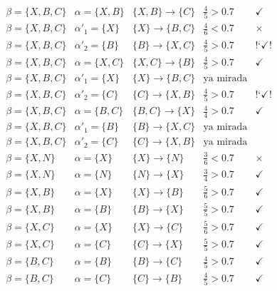\documentclass[12pt]{report}\usepackage[]{graphicx}\usepackage[dvipsnames]{xcolor}
\begin{document}
			$$
			\begin{array}{lllcc}
				\beta = \{X, B, C\} & \alpha = \{X, B\} & \boxed{\{X, B\} \rightarrow \{C\}} & \frac{4}{5} > 0.7 & \checkmark\\
				\beta = \{X, B, C\} & \alpha'_1 = \{X\} & \{X\} \rightarrow \{B, C\} & \frac{4}{6} < 0.7 & \times\\
				\beta = \{X, B, C\} & \alpha'_2 = \{B\} & \boxed{\{B\} \rightarrow \{X, C\}} & \frac{4}{5} > 0.7 & \text{!`}\checkmark!\\
				\beta = \{X, B, C\} & \alpha = \{X, C\} & \boxed{\{X, C\} \rightarrow \{B\}} & \frac{4}{5} > 0.7 & \checkmark\\
				\beta = \{X, B, C\} & \alpha'_1 = \{X\} & \{X\} \rightarrow \{B, C\} & \text{ya mirada} & \\
				\beta = \{X, B, C\} & \alpha'_2 = \{C\} & \boxed{\{C\} \rightarrow \{X, B\}} & \frac{4}{5} > 0.7 & \text{!`}\checkmark!\\
				\beta = \{X, B, C\} & \alpha = \{B, C\} & \boxed{\{B, C\} \rightarrow \{X\}} & \frac{4}{4} > 0.7 & \checkmark\\
				\beta = \{X, B, C\} & \alpha'_1 = \{B\} & \{B\} \rightarrow \{X, C\} & \text{ya mirada} & \\
				\beta = \{X, B, C\} & \alpha'_2 = \{C\} & \{C\} \rightarrow \{X, B\} & \text{ya mirada} & \\
				\beta = \{X, N\} & \alpha = \{X\} & \{X\} \rightarrow \{N\} & \frac{3}{6} < 0.7 & \times\\
				\beta = \{X, N\} & \alpha = \{N\} & \boxed{\{N\} \rightarrow \{X\}} & \frac{3}{4} > 0.7 & \checkmark\\
				\beta = \{X, B\} & \alpha = \{X\} & \boxed{\{X\} \rightarrow \{B\}} & \frac{5}{6} > 0.7 & \checkmark\\
				\beta = \{X, B\} & \alpha = \{B\} & \boxed{\{B\} \rightarrow \{X\}} & \frac{5}{5} > 0.7 & \checkmark\\
				\beta = \{X, C\} & \alpha = \{X\} & \boxed{\{X\} \rightarrow \{C\}} & \frac{5}{6} > 0.7 & \checkmark\\
				\beta = \{X, C\} & \alpha = \{C\} & \boxed{\{C\} \rightarrow \{X\}} & \frac{5}{5} > 0.7 & \checkmark\\
				\beta = \{B, C\} & \alpha = \{B\} & \boxed{\{B\} \rightarrow \{C\}} & \frac{4}{5} > 0.7 & \checkmark\\
				\beta = \{B, C\} & \alpha = \{C\} & \boxed{\{C\} \rightarrow \{B\}} & \frac{4}{5} > 0.7 & \checkmark
			\end{array}
			$$
			
\end{document}
